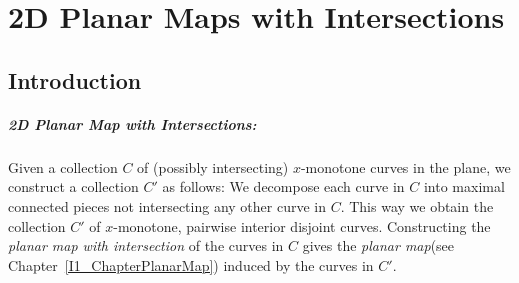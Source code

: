 
%
%
%
%
%
%
%
%
%
%
%
\chapter{2D Planar Maps with Intersections} \label{I1_ChapterPmwx}

\section{Introduction}

\paragraph{2D Planar Map with Intersections:} Given a collection $C$ of (possibly
intersecting) $x$-monotone curves in the plane, we construct a
collection $C'$ as follows: We decompose each curve in $C$ into
maximal connected pieces not intersecting any other curve in $C$.
This way we obtain the collection $C'$ of $x$-monotone, pairwise
interior disjoint curves.
Constructing the {\it planar map with intersection} of the curves
in $C$ gives the {\it planar map}(see
Chapter~\ref{I1_ChapterPlanarMap}) induced by the curves in $C'$.

